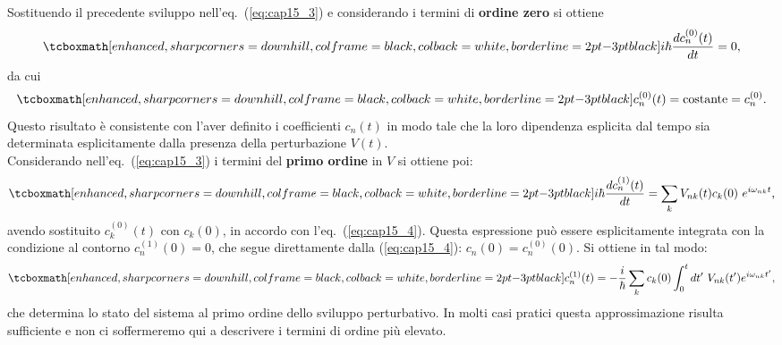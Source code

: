 Sostituendo il precedente sviluppo nell'eq.~(\ref{eq:cap15_3}) e considerando i termini di \textbf{ordine zero} si ottiene
	\begin{equation}
		\tcboxmath[enhanced, sharp corners=downhill, colframe=black, colback=white, borderline={2pt}{-3pt}{black}]{
			i\hbar \frac{d c_n ^{(0)}(t)}{dt}=0 ,
			}
	\end{equation}
da cui
	\begin{equation}
		\tcboxmath[enhanced, sharp corners=downhill, colframe=black, colback=white, borderline={2pt}{-3pt}{black}]{
			c_n ^{(0)}(t) = \textrm{costante}= c_n ^{(0)} .
			}
	\label{eq:cap15_4}
	\end{equation}
Questo risultato è consistente con l'aver definito i coefficienti $c_n (t)$ in modo tale che la loro dipendenza esplicita dal tempo sia determinata esplicitamente dalla presenza della perturbazione $V(t)$.\\

Considerando nell'eq.~(\ref{eq:cap15_3}) i termini del \textbf{primo ordine} in $V$ si ottiene poi:
	\begin{equation}
		\tcboxmath[enhanced, sharp corners=downhill, colframe=black, colback=white, borderline={2pt}{-3pt}{black}]{
			i\hbar \frac{d c_n ^{(1)}(t)}{dt}=\sum _k V_{nk} (t) c_k (0)\ e^{i\omega _{nk} t}  ,
			}
	\end{equation}
avendo sostituito $c_k ^{(0)} (t)$ con $c_k (0)$, in accordo con l'eq.~(\ref{eq:cap15_4}). Questa espressione può essere esplicitamente integrata con la condizione al contorno $ c_n ^{(1)} (0) =0$, che segue direttamente dalla (\ref{eq:cap15_4}): $c_n (0) = c_n ^{(0)} (0)$. Si ottiene in tal modo:
	\begin{equation}
		\tcboxmath[enhanced, sharp corners=downhill, colframe=black, colback=white, borderline={2pt}{-3pt}{black}]{
			c_n ^{(1)} (t) = -\frac{i}{\hbar} \sum _k c_k (0) \int _0 ^t dt'\ V_{nk} (t') e ^{i \omega _{nk} t'} ,
			}
	\label{eq:cap15_5}
	\end{equation}
che determina lo stato del sistema al primo ordine dello sviluppo perturbativo. In molti casi pratici questa approssimazione risulta sufficiente e non ci soffermeremo qui a descrivere i termini di ordine più elevato.\\


